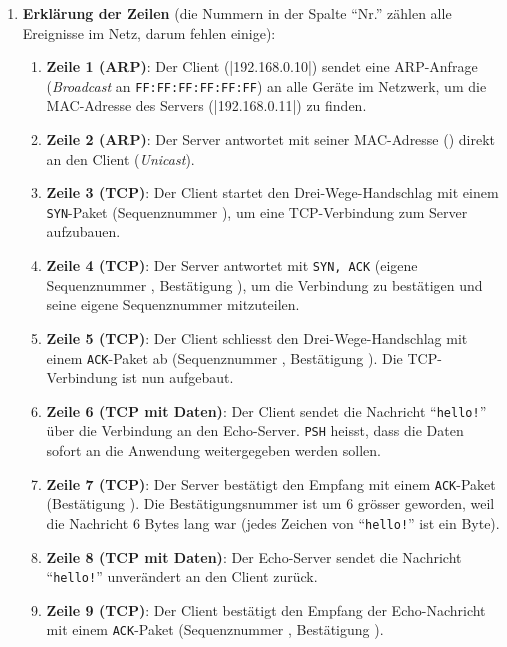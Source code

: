 \begin{myexercise}
\begin{myanswer}
		\begin{enumerate}
			\item \textbf{Erklärung der Zeilen} (die Nummern in der Spalte \enquote{Nr.} zählen alle Ereignisse im Netz, darum fehlen einige):
			\begin{enumerate}
			\item \textbf{Zeile 1 (\acrshort{ARP})}: Der Client (\commandbox|192.168.0.10|) sendet eine \gls{ARP}-Anfrage (\textit{Broadcast} an \texttt{FF:FF:FF:FF:FF:FF}) an alle Geräte im Netzwerk, um die \gls{MAC}-Adresse des Servers (\commandbox|192.168.0.11|) zu finden.
			\item \textbf{Zeile 2 (\acrshort{ARP})}: Der Server antwortet mit seiner \gls{MAC}-Adresse (\texttt{\echoServerMac}) direkt an den Client (\textit{Unicast}).
			\item \textbf{Zeile 3 (\acrshort{TCP})}: Der Client startet den Drei-Wege-Handschlag mit einem \texttt{SYN}-Paket (Sequenznummer \texttt{\echoClientSeq}), um eine \gls{TCP}-Verbindung zum Server aufzubauen.
			\item \textbf{Zeile 4 (\acrshort{TCP})}: Der Server antwortet mit \texttt{SYN, ACK} (eigene Sequenznummer \texttt{\echoServerSeq}, Bestätigung \texttt{\echoClientSeqA}), um die Verbindung zu bestätigen und seine eigene Sequenznummer mitzuteilen.
			\item \textbf{Zeile 5 (\acrshort{TCP})}: Der Client schliesst den Drei-Wege-Handschlag mit einem \texttt{ACK}-Paket ab (Sequenznummer \texttt{\echoClientSeqA}, Bestätigung \texttt{\echoServerSeqA}). Die \gls{TCP}-Verbindung ist nun aufgebaut.
			\item \textbf{Zeile 6 (\acrshort{TCP} mit Daten)}: Der Client sendet die Nachricht \enquote{\texttt{hello!}} über die Verbindung an den Echo-Server. \texttt{PSH} heisst, dass die Daten sofort an die Anwendung weitergegeben werden sollen.
			\item \textbf{Zeile 7 (\acrshort{TCP})}: Der Server bestätigt den Empfang mit einem \texttt{ACK}-Paket (Bestätigung \texttt{\echoClientSeqB}). Die Bestätigungsnummer ist um 6 grösser geworden, weil die Nachricht 6 Bytes lang war (jedes Zeichen von \enquote{\texttt{hello!}} ist ein Byte).
			\item \textbf{Zeile 8 (\acrshort{TCP} mit Daten)}: Der Echo-Server sendet die Nachricht \enquote{\texttt{hello!}} unverändert an den Client zurück.
			\item \textbf{Zeile 9 (\acrshort{TCP})}: Der Client bestätigt den Empfang der Echo-Nachricht mit einem \texttt{ACK}-Paket (Sequenznummer \texttt{\echoClientSeqB}, Bestätigung \texttt{\echoServerSeqB}).

\end{enumerate}
\end{enumerate}
\end{myanswer}
\end{myexercise}
